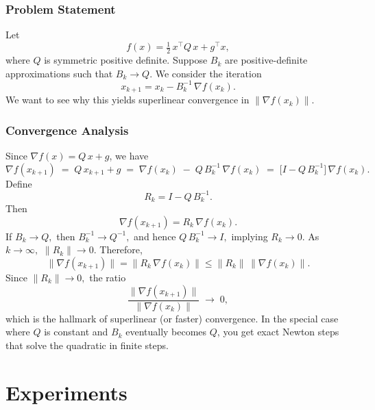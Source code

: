 \documentclass[a4paper,12pt]{article}
\begin{document}
\subsubsection*{Problem Statement}
Let
\[
  f(x) 
  = 
  \tfrac12 \, x^\top Q\,x 
  + 
  g^\top x,
\]
where $Q$ is symmetric positive definite. Suppose $B_k$ are positive-definite approximations such that $B_k \to Q$. We consider the iteration
\[
  x_{k+1} 
  = 
  x_k 
  - 
  B_k^{-1} \,\nabla f(x_k).
\]
We want to see why this yields superlinear convergence in $\|\nabla f(x_k)\|$.

\subsubsection*{Convergence Analysis}
Since $\nabla f(x) = Q\,x + g$, we have
\[
  \nabla f(x_{k+1})
  \;=\;
  Q\,x_{k+1} + g
  \;=\;
  \nabla f(x_k) 
  \;-\;
  Q\, B_k^{-1}\,\nabla f(x_k)
  \;=\;
  \bigl[I - Q\,B_k^{-1}\bigr]\,
  \nabla f(x_k).
\]
Define
\[
  R_k
  = 
  I - Q\,B_k^{-1}.
\]
Then
\[
  \nabla f(x_{k+1})
  =
  R_k\,\nabla f(x_k).
\]
If $B_k \to Q,$ then $B_k^{-1}\to Q^{-1},$ and hence $Q\,B_k^{-1}\to I,$ implying $R_k \to 0$. As $k\to\infty,$ $\|R_k\|\to 0.$ Therefore,
\[
  \|\nabla f(x_{k+1})\|
  =
  \| R_k\,\nabla f(x_k)\|
  \le
  \|R_k\|\,
  \|\nabla f(x_k)\|.
\]
Since $\|R_k\|\to 0,$ the ratio
\[
  \frac{\|\nabla f(x_{k+1})\|}{\|\nabla f(x_k)\|}
  \;\to\;
  0,
\]
which is the hallmark of superlinear (or faster) convergence. In the special case where $Q$ is constant and $B_k$ eventually becomes $Q$, you get exact Newton steps that solve the quadratic in finite steps.
\section{Experiments}

\end{document}
